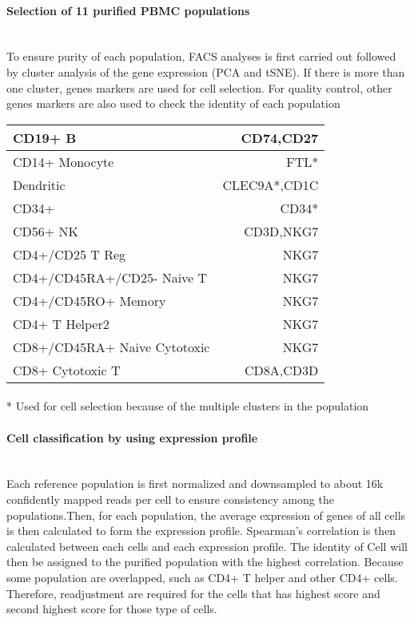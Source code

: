 \documentclass{article}
\begin{document}
\paragraph{Selection of 11 purified PBMC populations} ~\\
To ensure purity of each population, FACS analyses is first carried out followed by cluster analysis of the gene expression (PCA and tSNE). If there is more than one cluster, genes markers are used for cell selection. For quality control, other genes markers are also used to check the identity of each population \\
\par
\begin{tabular}{ |l| r| }
\hline
CD19+ B&CD74,CD27 \\ \hline
CD14+ Monocyte&FTL* \\ \hline       
Dendritic&CLEC9A*,CD1C \\ \hline     
CD34+&CD34*\\ \hline
CD56+ NK&CD3D,NKG7 \\ \hline
CD4+/CD25 T Reg& NKG7 \\ \hline
CD4+/CD45RA+/CD25- Naive T&NKG7 \\ \hline
CD4+/CD45RO+ Memory&NKG7 \\ \hline
CD4+ T Helper2&NKG7 \\ \hline
CD8+/CD45RA+ Naive Cytotoxic& NKG7 \\ \hline 
CD8+ Cytotoxic T&CD8A,CD3D\\ \hline
\end{tabular}
\par
\paragraph{}
* Used for cell selection because of the multiple clusters in the population
\paragraph{Cell classification by using expression profile } ~\\
Each reference population is first normalized and downsampled to about 16k confidently mapped reads per cell to ensure consistency among the populations.Then, for each population, the average expression of genes of all cells is then calculated to form the expression profile. Spearman’s correlation is then calculated between each cells and each expression profile. The identity of Cell will then be assigned to the purified population with the highest correlation. Because some population are overlapped, such as CD4+ T helper and other CD4+ cells. Therefore, readjustment are required for the cells that has highest score and second highest score for those type of cells.     
\end{document}
